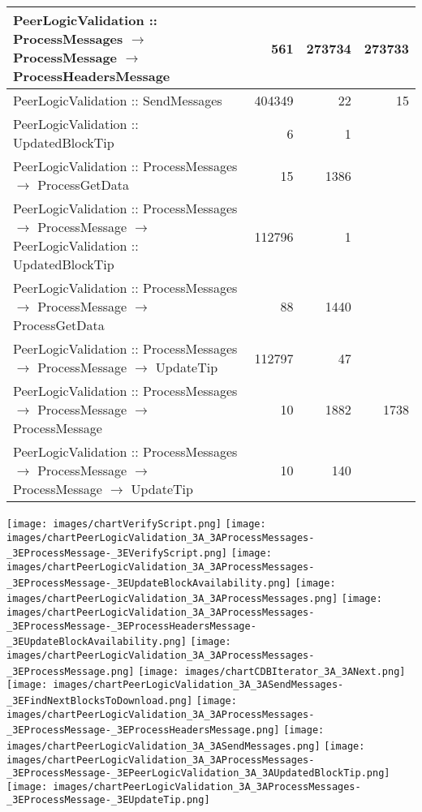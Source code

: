\documentclass{article}
\begin{document}
\begin{tabular}{P{5cm}|r|r|r}
PeerLogicValidation :: ProcessMessages $\to$ ProcessMessage $\to$ ProcessHeadersMessage& 561& 273734&273733\\\hline
PeerLogicValidation :: SendMessages& 404349& 22&15\\\hline
PeerLogicValidation :: UpdatedBlockTip& 6& 1&\\\hline
PeerLogicValidation :: ProcessMessages $\to$ ProcessGetData& 15& 1386&\\\hline
PeerLogicValidation :: ProcessMessages $\to$ ProcessMessage $\to$ PeerLogicValidation :: UpdatedBlockTip& 112796& 1&\\\hline
PeerLogicValidation :: ProcessMessages $\to$ ProcessMessage $\to$ ProcessGetData& 88& 1440&\\\hline
PeerLogicValidation :: ProcessMessages $\to$ ProcessMessage $\to$ UpdateTip& 112797& 47&\\\hline
PeerLogicValidation :: ProcessMessages $\to$ ProcessMessage $\to$ ProcessMessage& 10& 1882&1738\\\hline
PeerLogicValidation :: ProcessMessages $\to$ ProcessMessage $\to$ ProcessMessage $\to$ UpdateTip& 10& 140&\\\hline
\end{tabular}

\texttt{[image: images/chartVerifyScript.png]}
\texttt{[image: images/chartPeerLogicValidation\_3A\_3AProcessMessages-\_3EProcessMessage-\_3EVerifyScript.png]}
\texttt{[image: images/chartPeerLogicValidation\_3A\_3AProcessMessages-\_3EProcessMessage-\_3EUpdateBlockAvailability.png]}
\texttt{[image: images/chartPeerLogicValidation\_3A\_3AProcessMessages.png]}
\texttt{[image: images/chartPeerLogicValidation\_3A\_3AProcessMessages-\_3EProcessMessage-\_3EProcessHeadersMessage-\_3EUpdateBlockAvailability.png]}
\texttt{[image: images/chartPeerLogicValidation\_3A\_3AProcessMessages-\_3EProcessMessage.png]}
\texttt{[image: images/chartCDBIterator\_3A\_3ANext.png]}
\texttt{[image: images/chartPeerLogicValidation\_3A\_3ASendMessages-\_3EFindNextBlocksToDownload.png]}
\texttt{[image: images/chartPeerLogicValidation\_3A\_3AProcessMessages-\_3EProcessMessage-\_3EProcessHeadersMessage.png]}
\texttt{[image: images/chartPeerLogicValidation\_3A\_3ASendMessages.png]}
\texttt{[image: images/chartPeerLogicValidation\_3A\_3AProcessMessages-\_3EProcessMessage-\_3EPeerLogicValidation\_3A\_3AUpdatedBlockTip.png]}
\texttt{[image: images/chartPeerLogicValidation\_3A\_3AProcessMessages-\_3EProcessMessage-\_3EUpdateTip.png]}
\end{document}
